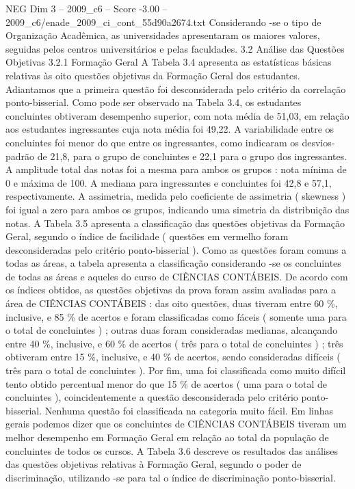 \begin{textsample}{NEG Dim 3 – 2009\_c6 – Score -3.00 – 2009\_c6/enade\_2009\_ci\_cont\_55d90a2674.txt}
Considerando -se o tipo de Organização Acadêmica, as universidades apresentaram os maiores valores, seguidas pelos centros universitários e pelas faculdades. 3.2 Análise das Questões Objetivas 3.2.1 Formação Geral A Tabela 3.4 apresenta as estatísticas básicas relativas às oito questões objetivas da Formação Geral dos estudantes.
Adiantamos que a primeira questão foi desconsiderada pelo critério da correlação ponto-bisserial.
Como pode ser observado na Tabela 3.4, os estudantes concluintes obtiveram desempenho superior, com nota média de 51,03, em relação aos estudantes ingressantes cuja nota média foi 49,22.
A variabilidade entre os concluintes foi menor do que entre os ingressantes, como indicaram os desvios-padrão de 21,8, para o grupo de concluintes e 22,1 para o grupo dos ingressantes.
A amplitude total das notas foi a mesma para ambos os grupos : nota mínima de 0 e máxima de 100.
A mediana para ingressantes e concluintes foi 42,8 e 57,1, respectivamente.
A assimetria, medida pelo coeficiente de assimetria ( skewness ) foi igual a zero para ambos os grupos, indicando uma simetria da distribuição das notas.
A Tabela 3.5 apresenta a classificação das questões objetivas da Formação Geral, segundo o índice de facilidade ( questões em vermelho foram desconsideradas pelo critério ponto-bisserial ).
Como as questões foram comuns a todas as áreas, a tabela apresenta a classificação considerando -se os concluintes de todas as áreas e aqueles do curso de CIÊNCIAS CONTÁBEIS.
De acordo com os índices obtidos, as questões objetivas da prova foram assim avaliadas para a área de CIÊNCIAS CONTÁBEIS : das oito questões, duas tiveram entre 60 \%, inclusive, e 85 \% de acertos e foram classificadas como fáceis ( somente uma para o total de concluintes ) ; outras duas foram consideradas medianas, alcançando entre 40 \%, inclusive, e 60 \% de acertos ( três para o total de concluintes ) ; três obtiveram entre 15 \%, inclusive, e 40 \% de acertos, sendo consideradas difíceis ( três para o total de concluintes ).
Por fim, uma foi classificada como muito difícil tento obtido percentual menor do que 15 \% de acertos ( uma para o total de concluintes ), coincidentemente a questão desconsiderada pelo critério ponto-bisserial.
Nenhuma questão foi classificada na categoria muito fácil.
Em linhas gerais podemos dizer que os concluintes de CIÊNCIAS CONTÁBEIS tiveram um melhor desempenho em Formação Geral em relação ao total da população de concluintes de todos os cursos.
A Tabela 3.6 descreve os resultados das análises das questões objetivas relativas à Formação Geral, segundo o poder de discriminação, utilizando -se para tal o índice de discriminação ponto-bisserial.

\end{textsample}
